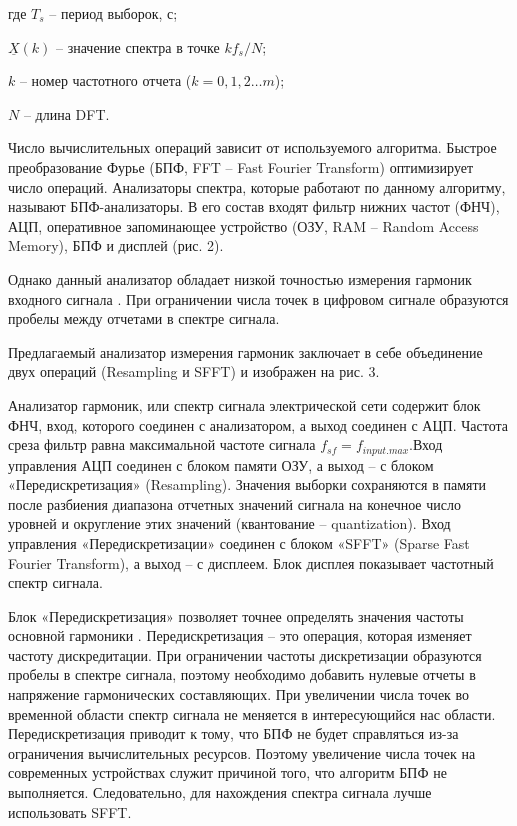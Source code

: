где $T_s$  – период выборок, с;

$\underline{X}(k)$ –  значение спектра в точке $kf_s/N$;

$k$ – номер частотного отчета ($k=0,1,2\ldots m$);

$N$ – длина DFT.

Число вычислительных операций зависит от используемого алгоритма. Быстрое преобразование Фурье (БПФ, FFT – Fast Fourier Transform) оптимизирует число операций. Анализаторы спектра, которые работают по 
данному алгоритму, называют БПФ-анализаторы. В его состав входят фильтр нижних частот (ФНЧ), АЦП, оперативное запоминающее устройство (ОЗУ, RAM – Random Access Memory), БПФ и дисплей (рис. 2). 

Однако данный анализатор обладает низкой точностью измерения гармоник входного сигнала \cite{Rauscher2006basics}.
При ограничении числа точек в цифровом сигнале образуются пробелы между отчетами в спектре сигнала.

Предлагаемый анализатор измерения гармоник заключает в себе объединение двух операций (Resampling и SFFT) и изображен на рис. 3.

Анализатор гармоник, или спектр сигнала электрической сети содержит блок ФНЧ, вход, которого соединен с анализатором, а выход соединен с АЦП. Частота среза фильтр равна максимальной частоте сигнала $f_{sf} = f_{input.max} $.Вход управления АЦП соединен с блоком памяти ОЗУ, а выход – с блоком «Передискретизация» (Resampling). Значения выборки сохраняются в памяти после разбиения диапазона отчетных значений сигнала на конечное число уровней и округление этих значений (квантование – quantization). Вход управления «Передискретизации» соединен с блоком «SFFT» (Sparse Fast
Fourier Transform), а выход – с дисплеем. Блок дисплея показывает частотный спектр сигнала.

Блок «Передискретизация» позволяет точнее определять значения 
частоты основной гармоники \cite{Thomasi2017electronic}. 
Передискретизация – это операция, которая изменяет частоту дискредитации. При ограничении частоты 
дискретизации образуются пробелы в спектре сигнала, поэтому необходимо добавить нулевые отчеты в напряжение гармонических составляющих. При увеличении числа точек во временной области спектр сигнала не меняется в интересующийся нас области. Передискретизация приводит к тому, что БПФ не будет справляться из-за ограничения вычислительных ресурсов. Поэтому увеличение числа точек 
на современных устройствах служит причиной того, что алгоритм БПФ не выполняется. Следовательно, для нахождения спектра сигнала лучше использовать SFFT.


